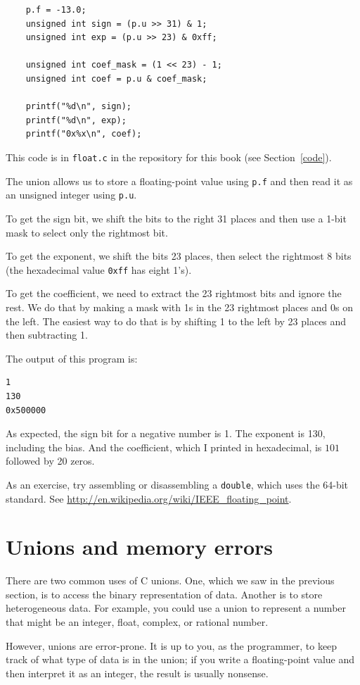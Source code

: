 \documentclass[12pt]{book}
\begin{document}
{\begin{verbatim}
    p.f = -13.0;
    unsigned int sign = (p.u >> 31) & 1;
    unsigned int exp = (p.u >> 23) & 0xff;

    unsigned int coef_mask = (1 << 23) - 1;
    unsigned int coef = p.u & coef_mask;

    printf("%d\n", sign);
    printf("%d\n", exp);
    printf("0x%x\n", coef);
\end{verbatim}
%
This code is in {\tt float.c} in the repository for this
book (see Section~\ref{code}).

The union allows us to store a floating-point value using
{\tt p.f} and then read it as an unsigned integer using
{\tt p.u}.

To get the sign bit, we shift the bits to the right 31
places and then use a 1-bit mask to select only the
rightmost bit.

To get the exponent, we shift the bits 23 places, then select the
rightmost 8 bits (the hexadecimal value {\tt 0xff} has eight 1's).

To get the coefficient, we need to extract the 23 rightmost bits
and ignore the rest.  We do that by making a mask with 1s in the
23 rightmost places and 0s on the left.  The easiest way to do that
is by shifting 1 to the left by 23 places and then subtracting 1.  

The output of this program is:
%
\begin{verbatim}
1
130
0x500000
\end{verbatim}
%
As expected, the sign bit for a negative number is 1.  The exponent 
is 130, including the bias.  And the coefficient, which I printed in
hexadecimal, is $101$ followed by 20 zeros.

As an exercise, try assembling or disassembling a {\tt double}, which
uses the 64-bit standard.  See
\url{http://en.wikipedia.org/wiki/IEEE_floating_point}.


\section{Unions and memory errors}

There are two common uses of C unions.  One, which we saw in the
previous section, is to access the binary representation of data.
Another is to store heterogeneous data.  For example, you could
use a union to represent a number that might be an integer, float,
complex, or rational number.

However, unions are error-prone.  It is up to you, as the programmer,
to keep track of what type of data is in the union; if you write
a floating-point value and then interpret it as an integer, the result
is usually nonsense.

}
\end{document}
